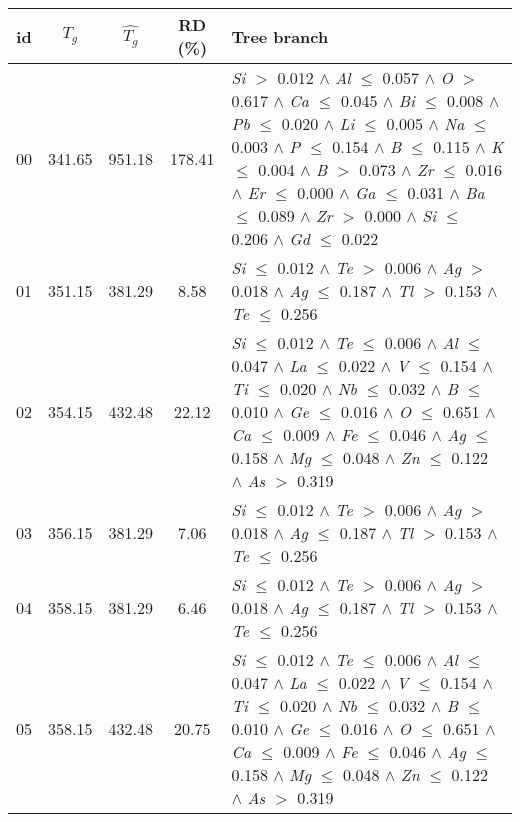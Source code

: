 \begin{table}[!htbp]
	\setlength{\tabcolsep}{3pt}
	\begin{tabular}{ccccm{}}
		\toprule
		id & $T_g$ & $\hat{T_g}$ & RD (\%) & Tree branch\\
		\midrule
		00 & 341.65 & 951.18 & 178.41 & \textit{Si} $>$ 0.012 $\wedge$ \textit{Al} $\le$ 0.057 $\wedge$ \textit{O} $>$ 0.617 $\wedge$ \textit{Ca} $\le$ 0.045 $\wedge$ \textit{Bi} $\le$ 0.008 $\wedge$ \textit{Pb} $\le$ 0.020 $\wedge$ \textit{Li} $\le$ 0.005 $\wedge$ \textit{Na} $\le$ 0.003 $\wedge$ \textit{P} $\le$ 0.154 $\wedge$ \textit{B} $\le$ 0.115 $\wedge$ \textit{K} $\le$ 0.004 $\wedge$ \textit{B} $>$ 0.073 $\wedge$ \textit{Zr} $\le$ 0.016 $\wedge$ \textit{Er} $\le$ 0.000 $\wedge$ \textit{Ga} $\le$ 0.031 $\wedge$ \textit{Ba} $\le$ 0.089 $\wedge$ \textit{Zr} $>$ 0.000 $\wedge$ \textit{Si} $\le$ 0.206 $\wedge$ \textit{Gd} $\le$ 0.022\\
		\hline
		01 & 351.15 & 381.29 & 8.58 & \textit{Si} $\le$ 0.012 $\wedge$ \textit{Te} $>$ 0.006 $\wedge$ \textit{Ag} $>$ 0.018 $\wedge$ \textit{Ag} $\le$ 0.187 $\wedge$ \textit{Tl} $>$ 0.153 $\wedge$ \textit{Te} $\le$ 0.256\\
		\hline
		02 & 354.15 & 432.48 & 22.12 & \textit{Si} $\le$ 0.012 $\wedge$ \textit{Te} $\le$ 0.006 $\wedge$ \textit{Al} $\le$ 0.047 $\wedge$ \textit{La} $\le$ 0.022 $\wedge$ \textit{V} $\le$ 0.154 $\wedge$ \textit{Ti} $\le$ 0.020 $\wedge$ \textit{Nb} $\le$ 0.032 $\wedge$ \textit{B} $\le$ 0.010 $\wedge$ \textit{Ge} $\le$ 0.016 $\wedge$ \textit{O} $\le$ 0.651 $\wedge$ \textit{Ca} $\le$ 0.009 $\wedge$ \textit{Fe} $\le$ 0.046 $\wedge$ \textit{Ag} $\le$ 0.158 $\wedge$ \textit{Mg} $\le$ 0.048 $\wedge$ \textit{Zn} $\le$ 0.122 $\wedge$ \textit{As} $>$ 0.319\\
		\hline
		03 & 356.15 & 381.29 & 7.06 & \textit{Si} $\le$ 0.012 $\wedge$ \textit{Te} $>$ 0.006 $\wedge$ \textit{Ag} $>$ 0.018 $\wedge$ \textit{Ag} $\le$ 0.187 $\wedge$ \textit{Tl} $>$ 0.153 $\wedge$ \textit{Te} $\le$ 0.256\\
		\hline
		04 & 358.15 & 381.29 & 6.46 & \textit{Si} $\le$ 0.012 $\wedge$ \textit{Te} $>$ 0.006 $\wedge$ \textit{Ag} $>$ 0.018 $\wedge$ \textit{Ag} $\le$ 0.187 $\wedge$ \textit{Tl} $>$ 0.153 $\wedge$ \textit{Te} $\le$ 0.256\\
		\hline
		05 & 358.15 & 432.48 & 20.75 & \textit{Si} $\le$ 0.012 $\wedge$ \textit{Te} $\le$ 0.006 $\wedge$ \textit{Al} $\le$ 0.047 $\wedge$ \textit{La} $\le$ 0.022 $\wedge$ \textit{V} $\le$ 0.154 $\wedge$ \textit{Ti} $\le$ 0.020 $\wedge$ \textit{Nb} $\le$ 0.032 $\wedge$ \textit{B} $\le$ 0.010 $\wedge$ \textit{Ge} $\le$ 0.016 $\wedge$ \textit{O} $\le$ 0.651 $\wedge$ \textit{Ca} $\le$ 0.009 $\wedge$ \textit{Fe} $\le$ 0.046 $\wedge$ \textit{Ag} $\le$ 0.158 $\wedge$ \textit{Mg} $\le$ 0.048 $\wedge$ \textit{Zn} $\le$ 0.122 $\wedge$ \textit{As} $>$ 0.319\\

\end{tabular}
\end{table}
